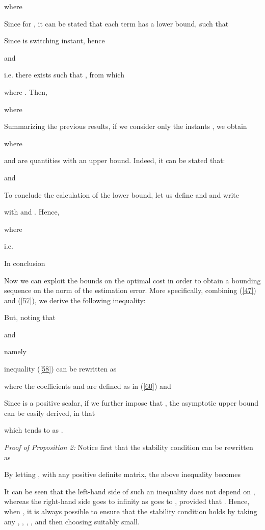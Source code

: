 \documentclass[11pt,journal,onecolumn]{IEEEtran}
\begin{document}
where

Since  for , it can be stated that each term  has a lower bound, such that

Since  is switching instant, hence

and

i.e. there exists  such that
, from which

where . Then,

where

Summarizing the previous results, if we consider  only the instants , we obtain

where

and  are quantities with an upper bound. Indeed, it can be stated that:

and

To conclude the calculation of the lower bound, let us define
 and  and write

with  and . Hence,

where

i.e.

In conclusion

Now we can exploit the bounds on the optimal cost  in order to obtain a bounding sequence on the norm of the estimation error. More specifically, combining (\ref{47}) and (\ref{57}), we derive the following inequality:

But, noting that

and

namely

inequality (\ref{58}) can be rewritten as

where the coefficients  and  are defined as in (\ref{60}) and

Since  is a positive scalar, if we further impose that , the asymptotic upper bound  can be easily derived, in that

which tends to  as . \hfill \vspace{.1cm} 
\vspace{.5cm}

{\em Proof of Proposition 2:}
Notice first that the stability condition  can be rewritten as

By letting , with  any positive definite matrix, the above inequality becomes

It can be seen that the left-hand side of such an inequality does not depend on , whereas the right-hand side goes to infinity as  goes to , provided that .
Hence, when , it is always possible to ensure that the stability condition  holds by taking any , , , , and then choosing 
suitably small.
\mbox{ } \hfill 
\vspace{.1cm}
\end{document}
